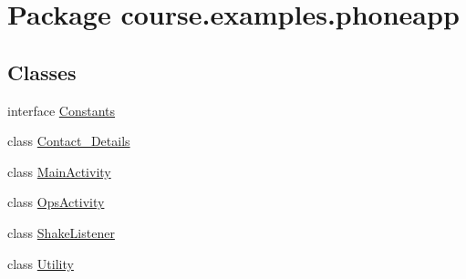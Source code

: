 \hypertarget{namespacecourse_1_1examples_1_1phoneapp}{}\section{Package course.\+examples.\+phoneapp}
\label{namespacecourse_1_1examples_1_1phoneapp}
\subsection*{Classes}
\begin{DoxyCompactItemize}
\item 
interface \hyperlink{interfacecourse_1_1examples_1_1phoneapp_1_1_constants}{Constants}
\item 
class \hyperlink{classcourse_1_1examples_1_1phoneapp_1_1_contact___details}{Contact\+\_\+\+Details}
\item 
class \hyperlink{classcourse_1_1examples_1_1phoneapp_1_1_main_activity}{Main\+Activity}
\item 
class \hyperlink{classcourse_1_1examples_1_1phoneapp_1_1_ops_activity}{Ops\+Activity}
\item 
class \hyperlink{classcourse_1_1examples_1_1phoneapp_1_1_shake_listener}{Shake\+Listener}
\item 
class \hyperlink{classcourse_1_1examples_1_1phoneapp_1_1_utility}{Utility}
\end{DoxyCompactItemize}
